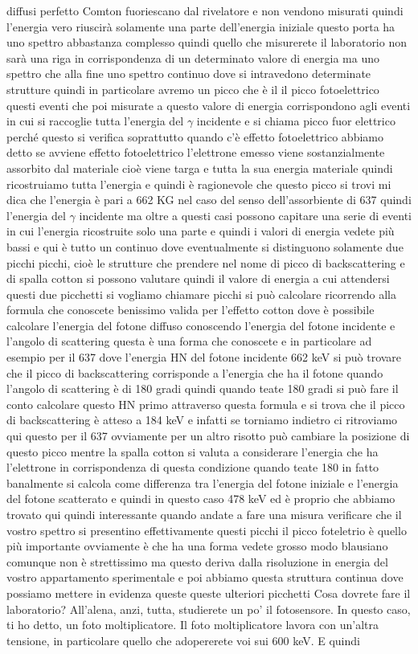diffusi perfetto Comton fuoriescano dal rivelatore e non vendono misurati quindi l'energia vero riuscirà solamente una parte dell'energia iniziale questo porta ha uno spettro abbastanza complesso quindi quello che misurerete il laboratorio non sarà una riga in corrispondenza di un determinato valore di energia ma uno spettro che alla fine uno spettro continuo dove si intravedono determinate strutture quindi in particolare avremo un picco che è il il picco fotoelettrico questi eventi che poi misurate a questo valore di energia corrispondono agli eventi in cui si raccoglie tutta l'energia del $\gamma$ incidente e si chiama picco fuor elettrico perché questo si verifica soprattutto quando c'è effetto fotoelettrico abbiamo detto se avviene effetto fotoelettrico l'elettrone emesso viene sostanzialmente assorbito dal materiale cioè viene targa e tutta la sua energia materiale quindi ricostruiamo tutta l'energia e quindi è ragionevole che questo picco si trovi mi dica che l'energia è pari a 662 KG nel caso del senso dell'assorbiente di 637 quindi l'energia del $\gamma$ incidente ma oltre a questi casi possono capitare una serie di eventi in cui l'energia ricostruite solo una parte e quindi i valori di energia vedete più bassi e qui è tutto un continuo dove eventualmente si distinguono solamente due picchi picchi, cioè le strutture che prendere nel nome di picco di backscattering e di spalla cotton si possono valutare quindi il valore di energia a cui attendersi questi due picchetti si vogliamo chiamare picchi si può calcolare ricorrendo alla formula che conoscete benissimo valida per l'effetto cotton dove è possibile calcolare l'energia del fotone diffuso conoscendo l'energia del fotone incidente e l'angolo di scattering questa è una forma che conoscete e in particolare ad esempio per il 637 dove l'energia HN del fotone incidente 662 keV si può trovare che il picco di backscattering corrisponde a l'energia che ha il fotone quando l'angolo di scattering è di 180 gradi quindi quando teate 180 gradi si può fare il conto calcolare questo HN primo attraverso questa formula e si trova che il picco di backscattering è atteso a 184 keV e infatti se torniamo indietro ci ritroviamo qui questo per il 637 ovviamente per un altro risotto può cambiare la posizione di questo picco mentre la spalla cotton si valuta a considerare l'energia che ha l'elettrone in corrispondenza di questa condizione quando teate 180 in fatto banalmente si calcola come differenza tra l'energia del fotone iniziale e l'energia del fotone scatterato e quindi in questo caso 478 keV ed è proprio che abbiamo trovato qui quindi interessante quando andate a fare una misura verificare che il vostro spettro si presentino effettivamente questi picchi il picco foteletrio è quello più importante ovviamente è che ha una forma vedete grosso modo blausiano comunque non è strettissimo ma questo deriva dalla risoluzione in energia del vostro appartamento sperimentale e poi abbiamo questa struttura continua dove possiamo mettere in evidenza queste queste ulteriori picchetti Cosa dovrete fare il laboratorio? All'alena, anzi, tutta, studierete un po' il fotosensore. In questo caso, ti ho detto, un foto moltiplicatore. Il foto moltiplicatore lavora con un'altra tensione, in particolare quello che adopererete voi sui 600 keV. E quindi 
